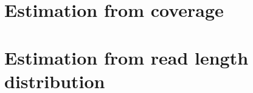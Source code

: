 
\lipsum[5]

\section{Estimation from coverage}

\lipsum[5]

\section{Estimation from read length distribution}

\lipsum[5]

